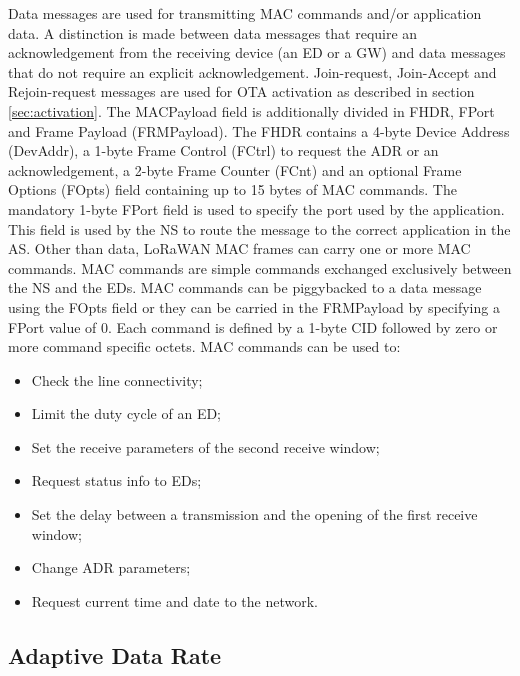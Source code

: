 Data messages are used for transmitting MAC commands and/or application data. A distinction is made between data messages that require an acknowledgement from the receiving device (an \gls{ED} or a \gls{GW}) and data messages that do not require an explicit acknowledgement. Join-request, Join-Accept and Rejoin-request messages are used for \gls{OTA} activation as described in section \ref{sec:activation}.  
The MACPayload field is additionally divided in \gls{FHDR}, \gls{FPort} and Frame Payload (FRMPayload). The \gls{FHDR} contains a 4-byte Device Address (DevAddr), a 1-byte Frame Control (FCtrl) to request the \gls{ADR} or an acknowledgement, a 2-byte Frame Counter (FCnt) and an optional Frame Options (FOpts) field containing up to 15 bytes of MAC commands. The mandatory 1-byte \gls{FPort} field is used to specify the port used by the application. This field is used by the \gls{NS} to route the message to the correct application in the \gls{AS}.
Other than data, LoRaWAN MAC frames can carry one or more MAC commands.  
MAC commands are simple commands exchanged exclusively between the \gls{NS} and the \glspl{ED}. MAC commands can be piggybacked to a data message using the FOpts field or they can be carried in the FRMPayload by specifying a FPort value of 0. Each command is defined by a 1-byte \gls{CID} followed by zero or more command specific octets.
MAC commands can be used to:

\begin{itemize}
 
    \item Check the line connectivity;
    \item Limit the duty cycle of an \gls{ED};
    \item Set the receive parameters of the second receive window;
    \item Request status info to \glspl{ED};
    \item Set the delay between a transmission and the opening of the first receive window;
    \item Change \gls{ADR} parameters;
    \item Request current time and date to the network.

\end{itemize}

\subsection{Adaptive Data Rate}


